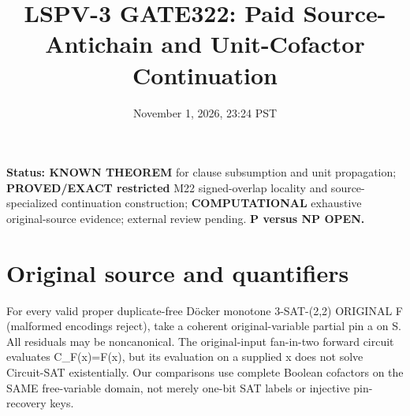 \documentclass[11pt]{article}
\title{LSPV-3 GATE322: Paid Source-Antichain and Unit-Cofactor Continuation}
\date{November 1, 2026, 23:24 PST}
\begin{document}
\maketitle
\noindent\textbf{Status: KNOWN THEOREM} for clause subsumption and unit propagation; \textbf{PROVED/EXACT restricted} M22 signed-overlap locality and source-specialized continuation construction; \textbf{COMPUTATIONAL} exhaustive original-source evidence; external review pending. \textbf{P versus NP OPEN.}
\section*{Original source and quantifiers}
For every valid proper duplicate-free D\"ocker monotone 3-SAT-(2,2) ORIGINAL F (malformed encodings reject), take a coherent original-variable partial pin a on S. All residuals may be noncanonical. The original-input fan-in-two forward circuit evaluates C_F(x)=F(x), but its evaluation on a supplied x does not solve Circuit-SAT existentially. Our comparisons use complete Boolean cofactors on the SAME free-variable domain, not merely one-bit SAT labels or injective pin-recovery keys.
\end{document}
